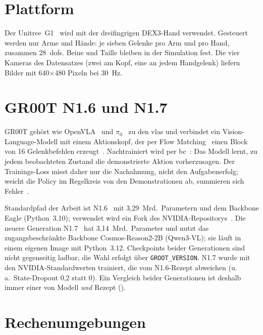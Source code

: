 \section{Plattform}
\label{sec:plattform}
\label{sec:humanoide-robotik}

Der Unitree~G1~\cite{unitree_g1} wird mit der dreifingrigen DEX3-Hand verwendet. Gesteuert
werden nur Arme und Hände: je sieben Gelenke pro Arm und pro Hand, zusammen 28~\acp{dof}.
Beine und Taille bleiben in der Simulation fest. Die vier Kameras des Datensatzes (zwei am
Kopf, eine an jedem Handgelenk) liefern Bilder mit 640$\times$480 Pixeln bei 30~Hz.

\section{GR00T N1.6 und N1.7}
\label{sec:vla}
\label{sec:imitation-learning}
\label{sec:flow-matching}

GR00T gehört wie OpenVLA~\cite{openvla2024} und $\pi_0$~\cite{pi0_2024} zu den \acp{vla} und verbindet ein Vision-Language-Modell mit einem Aktionskopf, der per Flow
Matching~\cite{lipman2023flow} einen Block von 16 Gelenkbefehlen erzeugt~\cite{groot2025}.
Nachtrainiert wird per \acf{bc}~\cite{hussein2017imitation}: Das Modell lernt, zu jedem
beobachteten Zustand die demonstrierte Aktion vorherzusagen. Der Trainings-Loss misst daher
nur die Nachahmung, nicht den Aufgabenerfolg; weicht die Policy im Regelkreis von den
Demonstrationen ab, summieren sich Fehler~\cite{ross2011dagger}.

Standardpfad der Arbeit ist N1.6~\cite{groot_n16} mit 3,29~Mrd.\ Parametern und dem
Backbone Eagle (Python~3.10); verwendet wird ein Fork des NVIDIA-Repositorys~\cite{groot_repo}.
Die neuere Generation N1.7~\cite{groot_n17} hat 3,14~Mrd.\ Parameter und nutzt das
zugangsbeschränkte Backbone Cosmos-Reason2-2B (Qwen3-VL); sie läuft in einem eigenen Image
mit Python~3.12. Checkpoints beider Generationen sind nicht gegenseitig ladbar, die Wahl erfolgt
über \texttt{GROOT\_VERSION}. N1.7 wurde mit den NVIDIA-Standardwerten trainiert, die vom
N1.6-Rezept abweichen (u.\,a.\ State-Dropout 0,2 statt 0). Ein Vergleich beider Generationen
ist deshalb immer einer von Modell \emph{und} Rezept
().

\section{Rechenumgebungen}
\label{sec:rechenumgebungen}
\label{sec:infrastruktur}
\label{sec:kisski}

